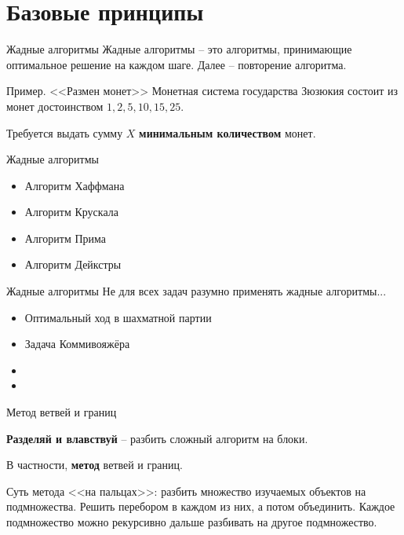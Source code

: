 \section{Базовые принципы}\label{section:base_principles}

\begin{frame}{Жадные алгоритмы}
	Жадные алгоритмы -- это алгоритмы, принимающие оптимальное решение на каждом шаге. Далее -- повторение алгоритма.
	
	\begin{block}{Пример. <<Размен монет>>}
		Монетная система государства Зюзюкия состоит из монет достоинством
		$1, 2, 5, 10, 15, 25$.
		
		Требуется выдать сумму $X$ \textbf{минимальным количеством} монет.
	\end{block}	
	
\end{frame}

\begin{frame}{Жадные алгоритмы}
	\begin{itemize}
		\item Алгоритм Хаффмана
		\item Алгоритм Крускала 
		\item Алгоритм Прима 
		\item Алгоритм Дейкстры
	\end{itemize}
\end{frame}


\begin{frame}{Жадные алгоритмы}
	Не для всех задач разумно применять жадные алгоритмы...
	
	
	\begin{itemize}
		\item Оптимальный ход в шахматной партии
		\item Задача Коммивояжёра
		\item {}
		\item {}
	\end{itemize}
\end{frame}


\begin{frame}{Метод ветвей и границ}
	
	\textbf{Разделяй и влавствуй} -- разбить сложный алгоритм на блоки.
	
	В частности, \textbf{метод} ветвей и границ.
	
	
	Суть метода <<на пальцах>>: разбить множество изучаемых объектов на подмножества. Решить перебором в каждом из них, а потом объединить.
	Каждое подмножество можно рекурсивно дальше разбивать на другое подмножество.
	
	
\end{frame}

